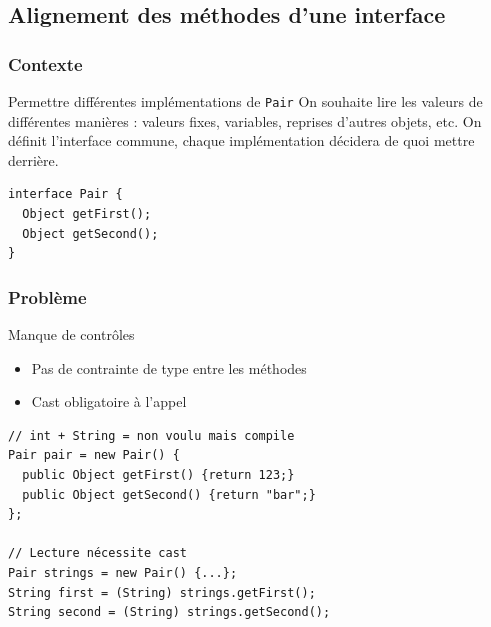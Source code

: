 \documentclass[draft]{beamer}
\begin{document}
\subsection{Alignement des méthodes d'une interface}

\begin{frame}[fragile]
\frametitle{Contexte}
\begin{block}{Permettre différentes implémentations de \lstinline{Pair}}
 On souhaite lire les valeurs de différentes manières : valeurs fixes, variables, reprises d'autres objets, etc.
 On définit l'interface commune, chaque implémentation décidera de quoi mettre derrière.
\end{block}
\begin{lstlisting}
interface Pair {
  Object getFirst();
  Object getSecond();
}
\end{lstlisting}
\end{frame}

\begin{frame}[fragile]
\frametitle{Problème}
\begin{alertblock}{Manque de contrôles}
 \begin{itemize}
  \item Pas de contrainte de type entre les méthodes
  \item Cast obligatoire à l'appel
 \end{itemize}
\end{alertblock}
\begin{lstlisting}
// int + String = non voulu mais compile
Pair pair = new Pair() {
  public Object getFirst() {return 123;}
  public Object getSecond() {return "bar";}
};

// Lecture nécessite cast
Pair strings = new Pair() {...};
String first = (String) strings.getFirst();
String second = (String) strings.getSecond();
\end{lstlisting}
\end{frame}
\end{document}
